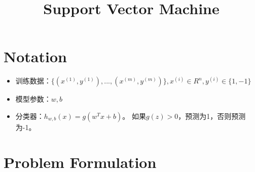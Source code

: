 \documentclass[11pt]{article}
\title{Support Vector Machine}
\begin{document}
\maketitle
\section{Notation}
\begin{itemize}
\item 训练数据：$\{(x^{(1)}, y^{(1)}), ..., (x^{(m)}, y^{(m)})\}, x^{(i)}\in R^n, y^{(i)}\in\{1, -1\}$
\item 模型参数：$w, b$
\item 分类器：$h_{w, b}(x)=g(w^Tx+b)$。 如果$g(z) > 0$，预测为1，否则预测为-1。
\end{itemize}

\section{Problem Formulation}
\end{document}
